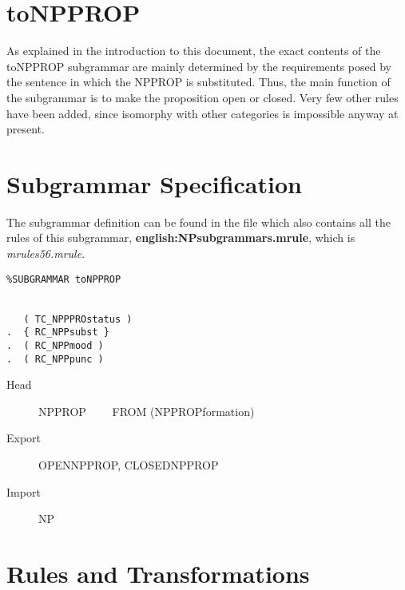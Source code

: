 \newpage
\section{toNPPROP}
As explained in the introduction to this document, the exact contents of the 
toNPPROP subgrammar are mainly determined 
by the requirements posed by the sentence in which the NPPROP is substituted.
Thus, the main function of the subgrammar is to make the proposition open or 
closed. Very few other rules have been added, since isomorphy with other 
categories is impossible anyway at present.

\section{Subgrammar Specification}
The subgrammar definition can be found in the file which also contains all the 
rules of this subgrammar, {\bf english:NPsubgrammars.mrule}, 
which is {\em mrules56.mrule\/}.

\begin{verbatim}
%SUBGRAMMAR toNPPROP


   ( TC_NPPPROstatus )
.  { RC_NPPsubst }
.  ( RC_NPPmood )
.  ( RC_NPPpunc )

\end{verbatim}

\begin{description}
  \item[Head]  NPPROP \ \ \ \ FROM (NPPROPformation)
  \item[Export] OPENNPPROP, CLOSEDNPPROP
  \item[Import] NP
\end{description}

\newpage
\section{Rules and Transformations}

